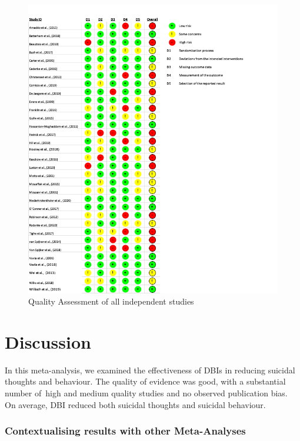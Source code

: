 \documentclass[
  english,
  man]{apa6}
\begin{document}
\begin{figure}
\centering
\includegraphics[width=21cm,height=\textheight]{01_Plots_Tables/RoB-II.png}
\caption{Quality Assessment of all independent studies}
\end{figure}

\hypertarget{discussion}{%
\section{Discussion}\label{discussion}}

In this meta-analysis, we examined the effectiveness of DBIs in reducing suicidal thoughts and behaviour. The quality of evidence was good, with a substantial number of~high and medium quality studies and no observed publication bias. On average, DBI reduced both suicidal thoughts and suicidal behaviour.

\hypertarget{contextualising-results-with-other-meta-analyses}{%
\subsubsection{Contextualising results with other Meta-Analyses}\label{contextualising-results-with-other-meta-analyses}}
\end{document}
